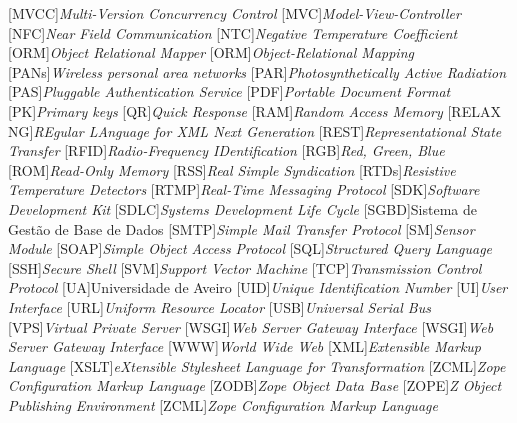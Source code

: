 \begin{multicols}{2}
\begin{acronym}[RELAX NG]
[MVCC]{\textit{Multi-Version Concurrency Control}}
[MVC]{\textit{Model-View-Controller}}
[NFC]{\textit{Near Field Communication}}
[NTC]{\textit{Negative Temperature Coefficient}}
[ORM]{\textit{Object Relational Mapper}}
[ORM]{\textit{Object-Relational Mapping}}
[PANs]{\textit{Wireless personal area networks}}
[PAR]{\textit{Photosynthetically Active Radiation}}
[PAS]{\textit{Pluggable Authentication Service}}
[PDF]{\textit{Portable Document Format}}
[PK]{\textit{Primary keys}}
[QR]{\textit{Quick Response}}
[RAM]{\textit{Random Access Memory}}
[RELAX NG]{\textit{REgular LAnguage for XML Next Generation}}
[REST]{\textit{Representational State Transfer}}
[RFID]{\textit{Radio-Frequency IDentification}}
[RGB]{\textit{Red, Green, Blue}}
[ROM]{\textit{Read-Only Memory}}
[RSS]{\textit{Real Simple Syndication}}
[RTDs]{\textit{Resistive Temperature Detectors}}
[RTMP]{\textit{Real-Time Messaging Protocol}}
[SDK]{\textit{Software Development Kit}}
[SDLC]{\textit{Systems Development Life Cycle}}
[SGBD]{Sistema de Gestão de Base de Dados}
[SMTP]{\textit{Simple Mail Transfer Protocol}}
[SM]{\textit{Sensor Module}}
[SOAP]{\textit{Simple Object Access Protocol}}
[SQL]{\textit{Structured Query Language}}
[SSH]{\textit{Secure Shell}}
[SVM]{\textit{Support Vector Machine}}
[TCP]{\textit{Transmission Control Protocol}}
[UA]{Universidade de Aveiro}
[UID]{\textit{Unique Identification Number}}
[UI]{\textit{User Interface}}
[URL]{\textit{Uniform Resource Locator}}
[USB]{\textit{Universal Serial Bus}}
[VPS]{\textit{Virtual Private Server }}
[WSGI]{\textit{Web Server Gateway Interface }}
[WSGI]{\textit{Web Server Gateway Interface}}
[WWW]{\textit{World Wide Web}}
[XML]{\textit{Extensible Markup Language}}
[XSLT]{\textit{eXtensible Stylesheet Language for Transformation}}
[ZCML]{\textit{Zope Configuration Markup Language}}
[ZODB]{\textit{Zope Object Data Base}}
[ZOPE]{\textit{Z Object Publishing Environment}}
[ZCML]{\textit{Zope Configuration Markup Language}}

	
\end{acronym}

\end{multicols}

